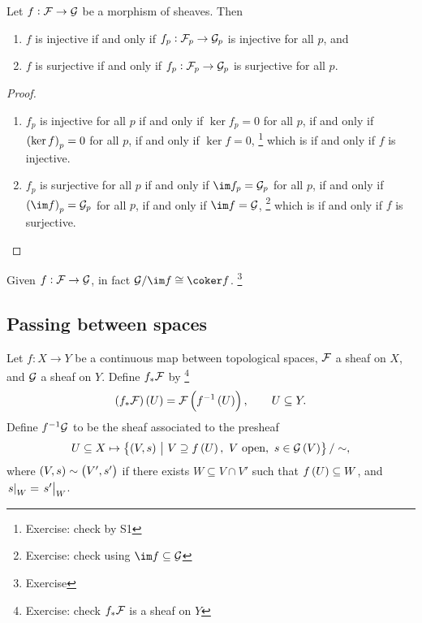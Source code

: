 \begin{proposition}
Let $ f : \mathcal{F} \to \mathcal{G} $ be a morphism of sheaves. Then
\begin{enumerate}
\item $ f $ is injective if and only if $ f_p : \mathcal{F}_p \to \mathcal{G}_p $ is injective for all $ p $, and
\item $ f $ is surjective if and only if $ f_p : \mathcal{F}_p \to \mathcal{G}_p $ is surjective for all $ p $.
\end{enumerate}
\end{proposition}

\begin{proof}
\hfill
\begin{enumerate}
\item $ f_p $ is injective for all $ p $ if and only if $ \ker f_p = 0 $ for all $ p $, if and only if $ \br{\ker f}_p = 0 $ for all $ p $, if and only if $ \ker f = 0 $, \footnote{Exercise: check by S1} which is if and only if $ f $ is injective.
\item $ f_p $ is surjective for all $ p $ if and only if $ \im f_p = \GGG_p $ for all $ p $, if and only if $ \br{\im f}_p = \GGG_p $ for all $ p $, if and only if $ \im f = \GGG $, \footnote{Exercise: check using $ \im f \subseteq \GGG $} which is if and only if $ f $ is surjective.
\end{enumerate}
\end{proof}

\begin{remark*}
Given $ f : \mathcal{F} \to \mathcal{G} $, in fact $ \GGG / \im f \cong \coker f $. \footnote{Exercise}
\end{remark*}

\subsection{Passing between spaces}


Let $ f : X \to Y $ be a continuous map between topological spaces, $ \mathcal{F} $ a sheaf on $ X $, and $ \mathcal{G} $ a sheaf on $ Y $. Define $ f_*\mathcal{F} $ by \footnote{Exercise: check $ f_*\mathcal{F} $ is a sheaf on $ Y $}
$$ \br{f_*\FFF}\br{U} = \FFF\br{f^{-1}\br{U}}, \qquad U \subseteq Y. $$
Define $ f^{-1}\mathcal{G} $ to be the sheaf associated to the presheaf
$$ U \subseteq X \mapsto \cbr{\br{V, s} \st V \supseteq f\br{U}, \ V \ \text{open}, \ s \in \GGG\br{V}} / \sim, $$
where $ \br{V, s} \sim \br{V', s'} $ if there exists $ W \subseteq V \cap V' $ such that $ f\br{U} \subseteq W $, and $ \left. s \right|_W = \left. s' \right|_W $.

